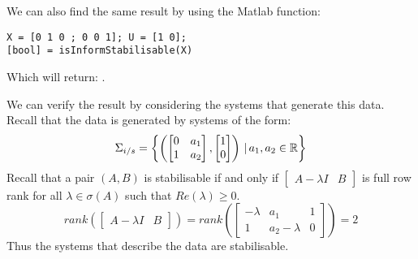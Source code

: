 We can also find the same result by using the Matlab function:
\begin{lstlisting}
X = [0 1 0 ; 0 0 1]; U = [1 0];
[bool] = isInformStabilisable(X)
\end{lstlisting}
Which will return: \mon{[ 1 ]}.

We can verify the result by considering the systems that generate this data. Recall that the data is generated by systems of the form:
\[ \Sigma_{i/s} = \left\{ \left( \begin{bmatrix} 0&a_1 \\ 1&a_2 \end{bmatrix}, \begin{bmatrix} 1 \\ 0 \end{bmatrix} \right) \, | \, a_1, a_2 \in \mathbb{R} \right\} \]
Recall that a pair $(A,B)$ is stabilisable if and only if $\begin{bmatrix} A - \lambda I & B \end{bmatrix}$ is full row rank for all $\lambda \in \sigma(A)$ such that $Re(\lambda) \geq 0$. 
\[ rank \left( \begin{bmatrix} A - \lambda I & B \end{bmatrix} \right) = rank \left( \begin{bmatrix} -\lambda & a_1 & 1 \\ 1 & a_2 - \lambda & 0 \end{bmatrix} \right) = 2 \]
Thus the systems that describe the data are stabilisable.